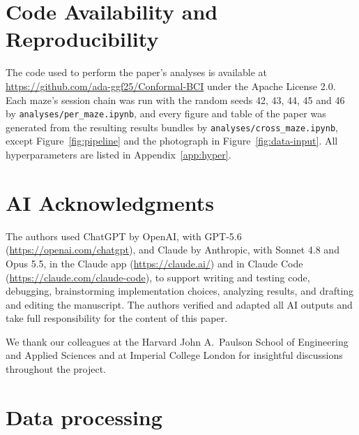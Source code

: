 \documentclass{article}
\begin{document}
\section*{Code Availability and Reproducibility}
The code used to perform the paper's analyses is available at \url{https://github.com/ada-ggf25/Conformal-BCI} under the Apache License 2.0. Each maze's session chain was run with the random seeds 42, 43, 44, 45 and 46 by \texttt{analyses/per\_maze.ipynb}, and every figure and table of the paper was generated from the resulting results bundles by \texttt{analyses/cross\_maze.ipynb}, except Figure~\ref{fig:pipeline} and the photograph in Figure~\ref{fig:data-input}. All hyperparameters are listed in Appendix~\ref{app:hyper}.

\section*{AI Acknowledgments}
The authors used ChatGPT by OpenAI, with GPT-5.6 (\url{https://openai.com/chatgpt}), and Claude by Anthropic, with Sonnet 4.8 and Opus 5.5, in the Claude app (\url{https://claude.ai/}) and in Claude Code (\url{https://claude.com/claude-code}), to support writing and testing code, debugging, brainstorming implementation choices, analyzing results, and drafting and editing the manuscript. The authors verified and adapted all AI outputs and take full responsibility for the content of this paper.

\begin{ack}
We thank our colleagues at the Harvard John A.\ Paulson School of Engineering and Applied Sciences and at Imperial College London for insightful discussions throughout the project.
\end{ack}




\newpage
\appendix

\section{Data processing}
\label{app:data}
\end{document}
